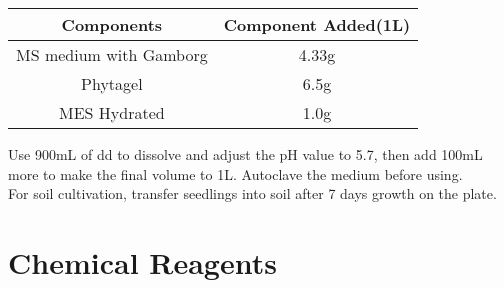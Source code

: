 \begin{tabular}{c c}
	\hline
	\textsf{\textbf{Components}} & \textsf{\textbf{Component Added(1L)}} \\
	\hline
	MS medium with Gamborg & 4.33g \\
	Phytagel & 6.5g\\
	MES Hydrated & 1.0g \\
	\hline
\end{tabular}
\linebreak
\linebreak
Use 900mL of dd to dissolve and adjust the pH value to 5.7, then add 100mL more  to make the final volume to 1L. Autoclave the medium before using.\\
For soil cultivation, transfer seedlings into soil after 7 days growth on the plate. 
\section{Chemical Reagents}
